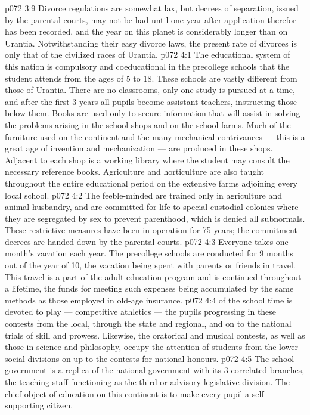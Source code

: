 \vs p072 3:9 Divorce regulations are somewhat lax, but decrees of separation, issued by the parental courts, may not be had until one year after application therefor has been recorded, and the year on this planet is considerably longer than on Urantia. Notwithstanding their easy divorce laws, the present rate of divorces is only  that of the civilized races of Urantia.
\vs p072 4:1 The educational system of this nation is compulsory and coeducational in the precollege schools that the student attends from the ages of 5 to 18. These schools are vastly different from those of Urantia. There are no classrooms, only one study is pursued at a time, and after the first 3 years all pupils become assistant teachers, instructing those below them. Books are used only to secure information that will assist in solving the problems arising in the school shops and on the school farms. Much of the furniture used on the continent and the many mechanical contrivances --- this is a great age of invention and mechanization --- are produced in these shops. Adjacent to each shop is a working library where the student may consult the necessary reference books. Agriculture and horticulture are also taught throughout the entire educational period on the extensive farms adjoining every local school.
\vs p072 4:2 \pc The feeble\hyp{}minded are trained only in agriculture and animal husbandry, and are committed for life to special custodial colonies where they are segregated by sex to prevent parenthood, which is denied all subnormals. These restrictive measures have been in operation for 75 years; the commitment decrees are handed down by the parental courts.
\vs p072 4:3 \pc Everyone takes one month’s vacation each year. The precollege schools are conducted for 9 months out of the year of 10, the vacation being spent with parents or friends in travel. This travel is a part of the adult\hyp{}education program and is continued throughout a lifetime, the funds for meeting such expenses being accumulated by the same methods as those employed in old\hyp{}age insurance.
\vs p072 4:4  of the school time is devoted to play --- competitive athletics --- the pupils progressing in these contests from the local, through the state and regional, and on to the national trials of skill and prowess. Likewise, the oratorical and musical contests, as well as those in science and philosophy, occupy the attention of students from the lower social divisions on up to the contests for national honours.
\vs p072 4:5 The school government is a replica of the national government with its 3 correlated branches, the teaching staff functioning as the third or advisory legislative division. The chief object of education on this continent is to make every pupil a self\hyp{}supporting citizen.
